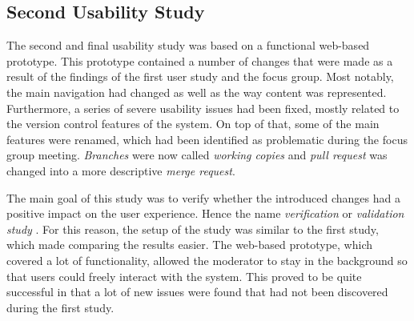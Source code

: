 
\subsection{Second Usability Study}
The second and final usability study was based on a functional web-based prototype. This prototype contained a number of changes that were made as a result of the findings of the first user study and the focus group. Most notably, the main navigation had changed as well as the way content was represented. Furthermore, a series of severe usability issues had been fixed, mostly related to the version control features of the system. On top of that, some of the main features were renamed, which had been identified as problematic during the focus group meeting. \textit{Branches} were now called \textit{working copies} and \textit{pull request} was changed into a more descriptive \textit{merge request}.

The main goal of this study was to verify whether the introduced changes had a positive impact on the user experience. Hence the name \textit{verification} or \textit{validation study} \cite{goodman_observing_2012,rubin_handbook_2008}.
For this reason, the setup of the study was similar to the first study, which made comparing the results easier. The web-based prototype, which covered a lot of functionality, allowed the moderator to stay in the background so that users could freely interact with the system. This proved to be quite successful in that a lot of new issues were found that had not been discovered during the first study.

